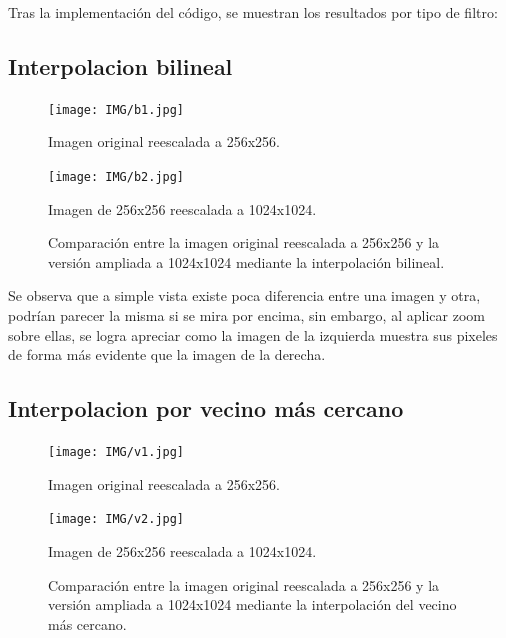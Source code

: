 \documentclass[11pt, letterpaper]{article}
\begin{document}
	Tras la implementación del código, se muestran los resultados por tipo de filtro:
	
	\subsection{Interpolacion bilineal}
	
	\begin{figure}[h]
		\centering
		\begin{minipage}{0.45\textwidth}
			\centering
			\texttt{[image: IMG/b1.jpg]}
			\caption{Imagen original reescalada a 256x256.}
			\label{fig:b1}
		\end{minipage}
		\hfill
		\begin{minipage}{0.45\textwidth}
			\centering
			\texttt{[image: IMG/b2.jpg]}
			\caption{Imagen de 256x256 reescalada a 1024x1024.}
			\label{fig:b2}
		\end{minipage}
		\caption{Comparación entre la imagen original reescalada a 256x256 y la versión ampliada a 1024x1024 mediante la interpolación bilineal.}
		\label{fig:comparacion}
	\end{figure}

	Se observa que a simple vista existe poca diferencia entre una imagen y otra, podrían parecer la misma si se mira por encima, sin embargo, al aplicar zoom sobre ellas, se logra apreciar como la imagen de la izquierda muestra sus pixeles de forma más evidente que la imagen de la derecha.
	
	\newpage
	
	
	\subsection{Interpolacion por vecino más cercano}
	
	\begin{figure}[h]
		\centering
		\begin{minipage}{0.45\textwidth}
			\centering
			\texttt{[image: IMG/v1.jpg]}
			\caption{Imagen original reescalada a 256x256.}
			\label{fig:b1}
		\end{minipage}
		\hfill
		\begin{minipage}{0.45\textwidth}
			\centering
			\texttt{[image: IMG/v2.jpg]}
			\caption{Imagen de 256x256 reescalada a 1024x1024.}
			\label{fig:b2}
		\end{minipage}
		\caption{Comparación entre la imagen original reescalada a 256x256 y la versión ampliada a 1024x1024 mediante la interpolación del vecino más cercano.}
		\label{fig:comparacion}
	\end{figure}
	
\end{document}
